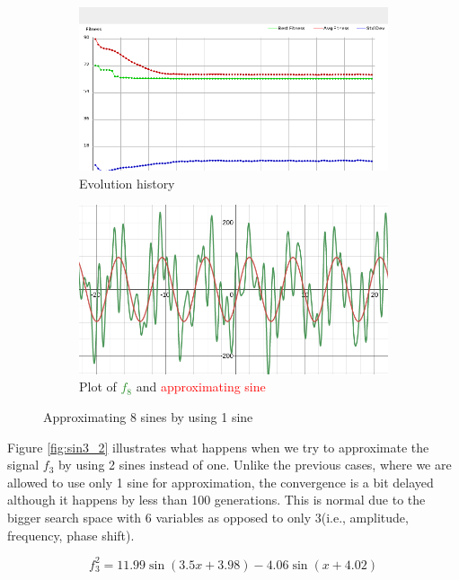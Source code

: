 \documentclass[conference]{IEEEtran}
\begin{document}
\begin{figure}[h]
\centering
\begin{subfigure}{.8\linewidth}
  \centering
  \includegraphics[width=.9\linewidth]{img/sin8_1_new.png}
  \caption{Evolution history}
  \label{fig:hist_sin8_1}
\end{subfigure}

\begin{subfigure}{.8\linewidth}
  \centering
  \includegraphics[width=.9\linewidth]{img/plot_sin8_1_new.png}
  \caption{Plot of \textcolor{ForestGreen}{$f_8$} and \textcolor{red}{approximating sine}}
  \label{fig:plot_sin8_1}
\end{subfigure}
\caption{Approximating 8 sines by using 1 sine}
\label{fig:sin8_1}
\end{figure}

Figure \ref{fig:sin3_2} illustrates what happens when we try to approximate the signal $f_3$ by using 2 sines instead of one. Unlike the previous cases, where we are allowed to use only 1 sine for approximation, 
the convergence is a bit delayed although it happens by less than 100 generations. This is normal due to the bigger search space with 6 variables as opposed to only 3(i.e., amplitude, frequency, phase shift).

\begin{equation}
	f_3^2 = 11.99\sin(3.5x+3.98) - 4.06\sin(x+4.02)
	\label{eq:f3_2}
\end{equation}
\end{document}
